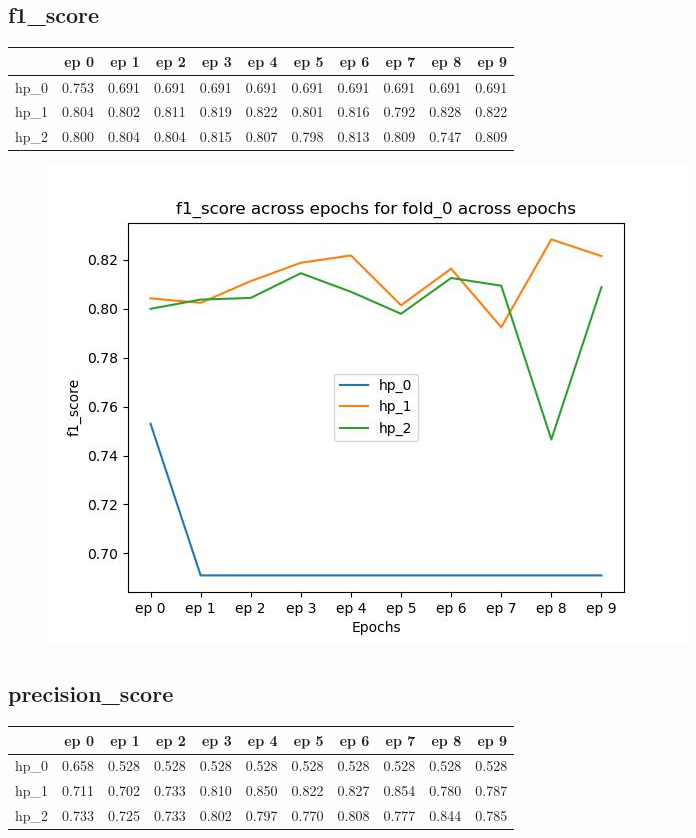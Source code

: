 \documentclass{article}
\begin{document}
\subsection{f1\_score}
\begin{tabular}{lrrrrrrrrrr}
\toprule
{} &   ep 0 &   ep 1 &   ep 2 &   ep 3 &   ep 4 &   ep 5 &   ep 6 &   ep 7 &   ep 8 &   ep 9 \\
\midrule
hp\_0 &  0.753 &  0.691 &  0.691 &  0.691 &  0.691 &  0.691 &  0.691 &  0.691 &  0.691 &  0.691 \\
hp\_1 &  0.804 &  0.802 &  0.811 &  0.819 &  0.822 &  0.801 &  0.816 &  0.792 &  0.828 &  0.822 \\
hp\_2 &  0.800 &  0.804 &  0.804 &  0.815 &  0.807 &  0.798 &  0.813 &  0.809 &  0.747 &  0.809 \\
\bottomrule
\end{tabular}

\begin{figure}[H]
\includegraphics[scale = 0.75]{fold_0/f1_score}
\end{figure}
\subsection{precision\_score}
\begin{tabular}{lrrrrrrrrrr}
\toprule
{} &   ep 0 &   ep 1 &   ep 2 &   ep 3 &   ep 4 &   ep 5 &   ep 6 &   ep 7 &   ep 8 &   ep 9 \\
\midrule
hp\_0 &  0.658 &  0.528 &  0.528 &  0.528 &  0.528 &  0.528 &  0.528 &  0.528 &  0.528 &  0.528 \\
hp\_1 &  0.711 &  0.702 &  0.733 &  0.810 &  0.850 &  0.822 &  0.827 &  0.854 &  0.780 &  0.787 \\
hp\_2 &  0.733 &  0.725 &  0.733 &  0.802 &  0.797 &  0.770 &  0.808 &  0.777 &  0.844 &  0.785 \\
\bottomrule
\end{tabular}
\end{document}
